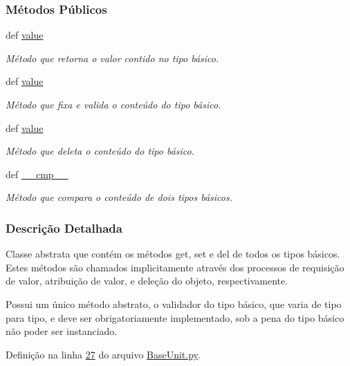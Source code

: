 \subsubsection*{Métodos Públicos}
\begin{DoxyCompactItemize}
\item 
def \hyperlink{classELO_1_1BaseUnit_1_1IfBaseType_ae4974528321f9314afd17c3da0e9d676}{value}
\begin{DoxyCompactList}\small\item\em Método que retorna o valor contido no tipo básico. \end{DoxyCompactList}\item 
def \hyperlink{classELO_1_1BaseUnit_1_1IfBaseType_ae4974528321f9314afd17c3da0e9d676}{value}
\begin{DoxyCompactList}\small\item\em Método que fixa e valida o conteúdo do tipo básico. \end{DoxyCompactList}\item 
def \hyperlink{classELO_1_1BaseUnit_1_1IfBaseType_ae4974528321f9314afd17c3da0e9d676}{value}
\begin{DoxyCompactList}\small\item\em Método que deleta o conteúdo do tipo básico. \end{DoxyCompactList}\item 
def \hyperlink{classELO_1_1BaseUnit_1_1IfBaseType_a69c338f6f1574bd3524e9d59ebc17a7c}{\-\_\-\-\_\-cmp\-\_\-\-\_\-}
\begin{DoxyCompactList}\small\item\em Método que compara o conteúdo de dois tipos básicos. \end{DoxyCompactList}\end{DoxyCompactItemize}


\subsubsection{Descrição Detalhada}
Classe abstrata que contém os métodos get, set e del de todos os tipos básicos. Estes métodos são chamados implicitamente através dos processos de requisição de valor, atribuição de valor, e deleção do objeto, respectivamente.

Possui um único método abstrato, o validador do tipo básico, que varia de tipo para tipo, e deve ser obrigatoriamente implementado, sob a pena do tipo básico não poder ser instanciado. 

Definição na linha \hyperlink{BaseUnit_8py_source_l00027}{27} do arquivo \hyperlink{BaseUnit_8py_source}{Base\-Unit.\-py}.



